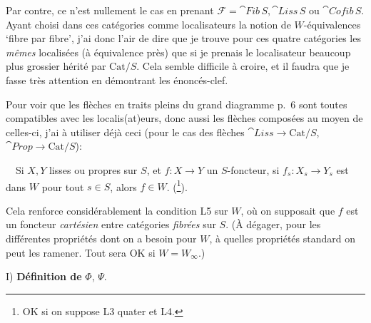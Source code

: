 Par contre, ce n'est nullement le cas en prenant $\mathcal{F} = \cat{Fib}\,S, \cat{Liss}\,S$ ou $\cat{Cofib}\,S$. Ayant choisi dans ces catégories comme localisateurs la notion de $W$-équivalences `fibre par fibre', j'ai donc l'air de dire que je trouve pour ces quatre catégories les \textit{mêmes} localisées (à équivalence près) que si je prenais le localisateur beaucoup plus grossier hérité par $\mathrm{Cat}/S$. Cela semble difficile à croire, et il faudra que je fasse très attention en démontrant les énoncés-clef.

Pour voir que les flèches en traits pleins du grand diagramme p.~6 sont toutes compatibles avec les localis(at)eurs, donc aussi les flèches composées au moyen de celles-ci, j'ai à utiliser déjà ceci (pour le cas des flèches $\cat{Liss} \longrightarrow \mathrm{Cat}/S$, $\cat{Prop} \longrightarrow \mathrm{Cat}/S$):

\ \ Si $X, Y$ lisses ou propres sur $S$, et $f : X \longrightarrow Y$ un $S$-foncteur, si $f_s : X_s \longrightarrow Y_s$ est dans $W$ pour tout $s \in S$, alors $f \in W$. (\footnote[7]{OK si on suppose L3 quater et L4.}).

Cela renforce considérablement la condition L5 sur $W$, où on supposait que $f$ est un foncteur \textit{cartésien} entre catégories \textit{fibrées} sur $S$. (À dégager, pour les différentes propriétés dont on a besoin pour $W$, à quelles propriétés standard on peut les ramener. Tout sera OK si $W = W_\infty$.)

I) \textbf{Définition de} $\Phi$, $\Psi$.

